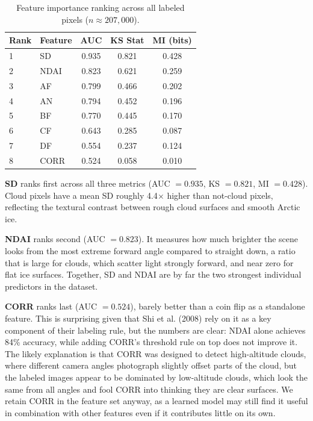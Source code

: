 \documentclass[10pt,letterpaper]{article}
\begin{document}
\begin{table}[H]
\centering
\begin{tabular}{llccc}
\hline
\textbf{Rank} & \textbf{Feature} & \textbf{AUC} & \textbf{KS Stat} & \textbf{MI (bits)} \\
\hline
1 & SD   & 0.935 & 0.821 & 0.428 \\
2 & NDAI & 0.823 & 0.621 & 0.259 \\
3 & AF   & 0.799 & 0.466 & 0.202 \\
4 & AN   & 0.794 & 0.452 & 0.196 \\
5 & BF   & 0.770 & 0.445 & 0.170 \\
6 & CF   & 0.643 & 0.285 & 0.087 \\
7 & DF   & 0.554 & 0.237 & 0.124 \\
8 & CORR & 0.524 & 0.058 & 0.010 \\
\hline
\end{tabular}
\caption{Feature importance ranking across all labeled pixels ($n \approx 207{,}000$).}
\label{tab:feature_importance}
\end{table}

\textbf{SD} ranks first across all three metrics (AUC $= 0.935$, KS $= 0.821$, MI $= 0.428$). Cloud pixels have a mean SD roughly 4.4$\times$ higher than not-cloud pixels, reflecting the textural contrast between rough cloud surfaces and smooth Arctic ice.

\textbf{NDAI} ranks second (AUC $= 0.823$). It measures how much brighter the scene looks from the most extreme forward angle compared to straight down, a ratio that is large for clouds, which scatter light strongly forward, and near zero for flat ice surfaces. Together, SD and NDAI are by far the two strongest individual predictors in the dataset.

\textbf{CORR} ranks last (AUC $= 0.524$), barely better than a coin flip as a standalone feature. This is surprising given that Shi et al. (2008) rely on it as a key component of their labeling rule, but the numbers are clear: NDAI alone achieves 84\% accuracy, while adding CORR's threshold rule on top does not improve it. The likely explanation is that CORR was designed to detect high-altitude clouds, where different camera angles photograph slightly offset parts of the cloud, but the labeled images appear to be dominated by low-altitude clouds, which look the same from all angles and fool CORR into thinking they are clear surfaces. We retain CORR in the feature set anyway, as a learned model may still find it useful in combination with other features even if it contributes little on its own.
\end{document}
